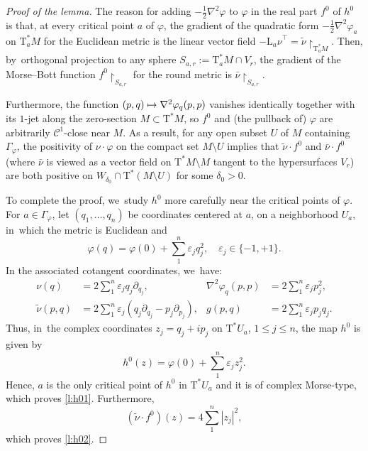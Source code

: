 \documentclass[JEP,XML,SOM,Unicode]{cedram}
\newcommand\mto{\mathchoice{\longmapsto}{\mapsto}{\mapsto}{\mapsto}}
\let\epsilon\varepsilon
\newcommand{\cC}{{\mathcal{C}}}
\newcommand{\Crit}{\Gamma_{\!\varphi}}
\newcommand{\etc}{,\ldots,}
\newcommand{\sT}{\mathrm{T}^\ast}
\newcommand{\hnu}{\tilde\nu}
\newcommand{\cnu}{\bar\nu}
\def\Lnu_#1{{\mathrm L_#1\nu}}
\newcommand{\de}{\mathrel{:=}}
\newcommand{\rst}[1]{{\upharpoonright}_{\!#1}}
\let\del\partial
\let\sgn\epsilon
\theoremstyle{plain}
\theoremstyle{definition}
\begin{document}
\begin{proof}[Proof of the lemma]
The reason for adding $-\frac12 \nabla^2\varphi$ to $\varphi$ in the real part
$f^0$ of $h^0$ is that, at every critical point $a$ of $\varphi$, the gradient
of the quadratic form $-\frac12 \nabla^2\varphi_a$ on $\sT_aM$ for the Euclidean
metric is the linear vector field $-\Lnu_a^\top = \hnu \rst{ \sT_aM }$. Then, by~orthogonal projection to any sphere $S_{a,r} \de \sT_aM \cap V_r$, the gradient
of the Morse--Bott function $f^0 \rst{ S_{a,r} }$ for the round metric is $\cnu
\rst{ S_{a,r} }$.

Furthermore, the function $(p,q) \mto \nabla^2\varphi_q (p,p)$ vanishes
identically together with its $1$-jet along the zero-section $M \subset \sT M$,
so $f^0$ and (the pullback of) $\varphi$ are arbitrarily $\cC^1$-close near $M$.
As a result, for any open subset $U$ of $M$ containing $\Crit$, the positivity
of $\nu \cdot \varphi$ on the compact set $M \setminus U$ implies that $\hnu \cdot f^0$
and $\cnu \cdot f^0$ (where $\cnu$ is viewed as a vector field on $\sT M \setminus M$
tangent to the hypersurfaces $V_r$) are both positive on $W_{\delta_0} \cap \sT
(M \setminus U)$ for some $\delta_0 > 0$.

To complete the proof, we~study $h^0$ more carefully near the critical points of
$\varphi$. For $a \in \Crit$, let $(q_1 \etc q_n)$ be coordinates centered at
$a$, on a neighborhood $U_a$, in~which the metric is Euclidean and
\[
\varphi(q) = \varphi(0) + \sum_1^n \sgn_j q_j^2, \quad
 \sgn_j \in \{-1,+1\}.
\]
In the associated cotangent coordinates, we~have:
\begin{align*}
 \nu(q) &= 2 \sum_1^n \sgn_j q_j \del_{q_j}, &
 \nabla^2\varphi_q(p,p) &= 2 \sum_1^n \sgn_j p_j^2, \\
 \hnu(p,q) &= 2 \sum_1^n \sgn_j (q_j \del_{q_j} - p_j \del_{p_j}), &
 g(p,q) &= 2 \sum_1^n \sgn_j p_jq_j.
\end{align*}
Thus, in~the complex coordinates $z_j = q_j+ip_j$ on $\sT U_a$, $1 \le j \le n$,
the map $h^0$ is given by
\[
h^0(z) = \varphi(0) + \sum_1^n \sgn_j z_j^2.
\]
Hence, $a$ is the only critical point of $h^0$ in $\sT U_a$ and it is of complex
Morse-type, which proves \eqref{l:h01}. Furthermore,
\[
(\hnu \cdot f^0)(z) = 4 \sum_1^n |z_j|^2,
\]
which proves \eqref{l:h02}.


\end{proof}
\end{document}
